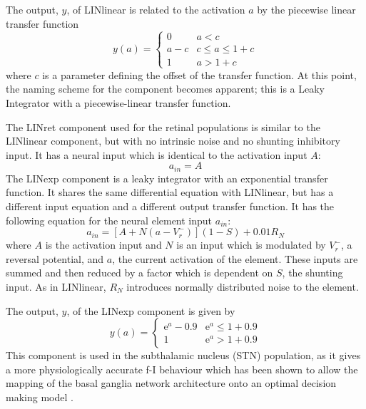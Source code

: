 \documentclass{frontiersSCNS}
\begin{document}
The output, $y$, of LINlinear is related to the activation $a$ by the
piecewise linear transfer function
\begin{equation} \label{eq:lintransfunc}
   y(a) = \begin{cases}
      0   & a < c \\
      a-c & c \leq a \leq 1+c \\
      1   & a > 1+c
   \end{cases}
\end{equation}
where $c$ is a parameter defining the offset of the transfer
function.  At this point, the naming scheme for the
component becomes apparent; this is a Leaky Integrator with a
piecewise-linear transfer function.

The LINret component used for the retinal populations is similar to
the LINlinear component, but with no intrinsic noise and no shunting
inhibitory input. It has a neural input which is identical to the
activation input $A$:
\begin{equation}
   a_{in} = A
\end{equation}
The LINexp component is a leaky integrator with an exponential
transfer function. It shares the same differential equation with
LINlinear, but has a different input equation and a different output
transfer function. It has the following equation for the neural
element input $a_{in}$:
\begin{equation}
   a_{in} = [A+N(a-V_{r}^{-})] (1-S) + 0.01 R_N
\end{equation}
where $A$ is the activation input and $N$ is an input which is
modulated by $V_{r}^{-}$, a reversal potential, and $a$, the current
activation of the element. These inputs are summed and then reduced by
a factor which is dependent on $S$, the shunting input. As in
LINlinear, $R_N$ introduces normally distributed noise to the element.

The output, $y$, of the LINexp component is given by
\begin{equation}
   y(a) = \begin{cases}
      \mathrm{e}^{a}-0.9   & \mathrm{e}^a \leq 1+0.9 \\
      1   & \mathrm{e}^a > 1+0.9
   \end{cases}
\end{equation}
This component is used in the subthalamic nucleus (STN) population, as
it gives a more physiologically accurate f-I
behaviour
\citep{wilson_model_2004,bevan_mechanisms_1999,hallworth_apamin-sensitive_2003}
which has been shown to allow the mapping of the basal ganglia network
architecture onto an optimal decision making
model \citep{bogacz_basal_2007}.
\end{document}
